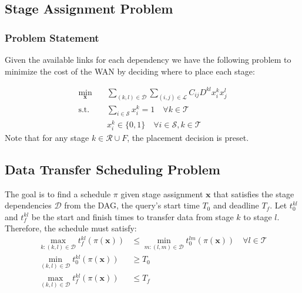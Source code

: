 \subsection{Stage Assignment Problem}

\subsubsection{Problem Statement}

Given the available links for each dependency we have the following problem to minimize the cost of the WAN by deciding where to place each stage:

\begin{subequations}\label{eq:opt_stage}
	\begin{align}
		\min_{\mathbf{x}} \quad & \sum_{(k,l)\in\mathcal{D}}\sum_{(i,j)\in\mathcal{L}}C_{ij}D^{kl}x_i^kx_j^l \nonumber \\
		\text{s.t.}\quad & \sum_{i\in\mathcal{S}}x_i^k = 1 \quad \forall k\in\mathcal{T} \label{eq:opt_stage-sum1} \\
		& x_i^k \in \{0,1\} \quad \forall i\in\mathcal{S},k\in\mathcal{T} \label{eq:opt_stage-binary}
	\end{align}
\end{subequations}
Note that for any stage $k\in\mathcal{R}\cup F$, the placement decision is preset.

\subsection{Data Transfer Scheduling Problem}

The goal is to find a schedule $\pi$ given stage assignment $\mathbf{x}$ that satisfies the stage dependencies $\mathcal{D}$ from the DAG, the query's start time $T_0$ and deadline $T_f$.
Let $t_0^{kl}$ and $t_f^{kl}$ be the start and finish times to transfer data from stage $k$ to stage $l$.
Therefore, the schedule must satisfy:
\begin{subequations}
	\begin{align}
		\max_{k:(k,l)\in\mathcal{D}}t_f^{kl}(\pi(\mathbf{x})) & \leq \min_{m:(l,m)\in\mathcal{D}}t_0^{lm}(\pi(\mathbf{x})) \quad \forall l\in\mathcal{T} \\
		\min_{(k,l)\in\mathcal{D}}t_0^{kl}(\pi(\mathbf{x})) & \geq T_0 \\
		\max_{(k,l)\in\mathcal{D}}t_f^{kl}(\pi(\mathbf{x})) & \leq T_f
	\end{align}
\end{subequations}

